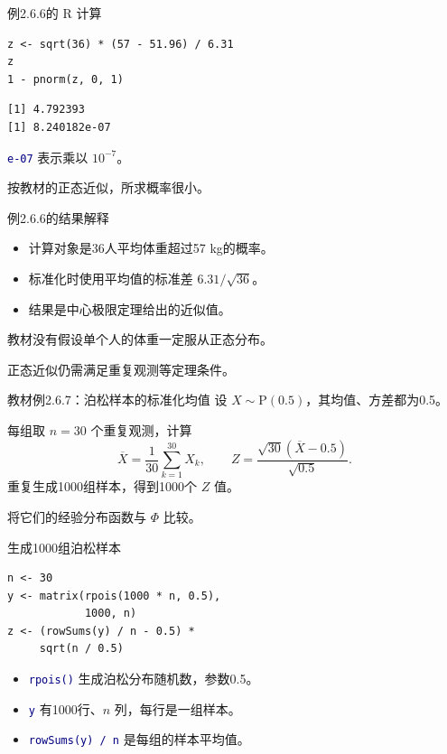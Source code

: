 \documentclass[14pt,compress,t,noamsthm,notheorem,table,handout,fontset=none]{ctexbeamer}
\newcommand{\code}[1]{\textcolor{navy}{\texttt{#1}}}
\newcommand{\inputlabel}{\par\smallskip{\fontsize{10.5}{13}\selectfont\bfseries\color{muted}输入代码\par}}
\newcommand{\outputlabel}{\par\smallskip{\fontsize{10.5}{13}\selectfont\bfseries\color{muted}Console 输出\par}}
\begin{document}
\begin{frame}[fragile]{例2.6.6的 R 计算}
  \inputlabel
\begin{lstlisting}
z <- sqrt(36) * (57 - 51.96) / 6.31
z
1 - pnorm(z, 0, 1)
\end{lstlisting}
  \outputlabel
\begin{lstlisting}[style=output]
[1] 4.792393
[1] 8.240182e-07
\end{lstlisting}
  \code{e-07} 表示乘以 $10^{-7}$。\par\smallskip
  按教材的正态近似，所求概率很小。
\end{frame}

\begin{frame}{例2.6.6的结果解释}
  \begin{itemize}
    \item 计算对象是36人平均体重超过57 kg的概率。
    \item 标准化时使用平均值的标准差 $6.31/\sqrt{36}$。
    \item 结果是中心极限定理给出的近似值。
  \end{itemize}
  \medskip
  教材没有假设单个人的体重一定服从正态分布。\par\smallskip
  正态近似仍需满足重复观测等定理条件。
\end{frame}

\begin{frame}{教材例2.6.7：泊松样本的标准化均值}
  设 $X\sim\mathrm{P}(0.5)$，其均值、方差都为0.5。\par\medskip
  每组取 $n=30$ 个重复观测，计算
  \[
    \overline X=\frac{1}{30}\sum_{k=1}^{30}X_k,
    \qquad Z=\frac{\sqrt{30}(\overline X-0.5)}{\sqrt{0.5}}.
  \]
  重复生成1000组样本，得到1000个 $Z$ 值。\par\smallskip
  将它们的经验分布函数与 $\Phi$ 比较。
\end{frame}

\begin{frame}[fragile]{生成1000组泊松样本}
  \inputlabel
\begin{lstlisting}
n <- 30
y <- matrix(rpois(1000 * n, 0.5),
            1000, n)
z <- (rowSums(y) / n - 0.5) *
     sqrt(n / 0.5)
\end{lstlisting}
  \begin{itemize}
    \item \code{rpois()} 生成泊松分布随机数，参数0.5。
    \item \code{y} 有1000行、$n$ 列，每行是一组样本。
    \item \code{rowSums(y) / n} 是每组的样本平均值。
  \end{itemize}
\end{frame}
\end{document}

